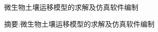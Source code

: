 \pagestyle{empty}
\begin{center}
\vspace*{4em}
 \heiti 微生物土壤运移模型的求解及仿真软件编制
\vspace*{3em}
\end{center}
\noindent 摘要:微生物土壤运移模型的求解及仿真软件编制 \\
